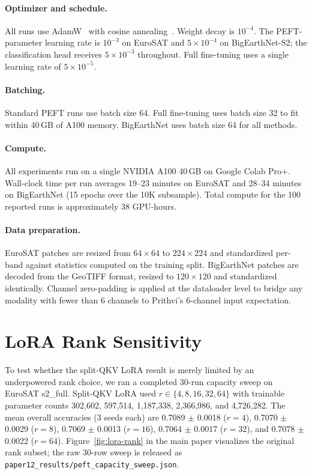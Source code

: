 \documentclass[11pt]{article}
\begin{document}
\paragraph{Optimizer and schedule.}
All runs use AdamW~\cite{loshchilov2019adamw} with cosine annealing~\cite{loshchilov2017sgdr}. Weight decay is $10^{-4}$. The PEFT-parameter learning rate is $10^{-3}$ on EuroSAT and $5\times 10^{-4}$ on BigEarthNet-S2; the classification head receives $5\times 10^{-3}$ throughout. Full fine-tuning uses a single learning rate of $5\times 10^{-5}$.

\paragraph{Batching.}
Standard PEFT runs use batch size 64. Full fine-tuning uses batch size 32 to fit within 40\,GB of A100 memory. BigEarthNet uses batch size 64 for all methods.

\paragraph{Compute.}
All experiments run on a single NVIDIA A100 40\,GB on Google Colab Pro+. Wall-clock time per run averages 19--23 minutes on EuroSAT and 28--34 minutes on BigEarthNet (15 epochs over the 10K subsample). Total compute for the 100 reported runs is approximately 38 GPU-hours.

\paragraph{Data preparation.}
EuroSAT patches are resized from $64\times 64$ to $224\times 224$ and standardized per-band against statistics computed on the training split. BigEarthNet patches are decoded from the GeoTIFF format, resized to $120\times 120$ and standardized identically. Channel zero-padding is applied at the dataloader level to bridge any modality with fewer than 6 channels to Prithvi's 6-channel input expectation.

\section{LoRA Rank Sensitivity}
\label{app:lora-rank}

To test whether the split-QKV LoRA result is merely limited by an underpowered rank choice, we ran a completed 30-run capacity sweep on EuroSAT s2\_full. Split-QKV LoRA used $r\in\{4,8,16,32,64\}$ with trainable parameter counts 302{,}602, 597{,}514, 1{,}187{,}338, 2{,}366{,}986, and 4{,}726{,}282. The mean overall accuracies (3 seeds each) are 0.7089 $\pm$ 0.0018 ($r=4$), 0.7070 $\pm$ 0.0029 ($r=8$), 0.7069 $\pm$ 0.0013 ($r=16$), 0.7064 $\pm$ 0.0017 ($r=32$), and 0.7078 $\pm$ 0.0022 ($r=64$). Figure~\ref{fig:lora-rank} in the main paper visualizes the original rank subset; the raw 30-row sweep is released as \texttt{paper12\_results/peft\_capacity\_sweep.json}.
\end{document}

